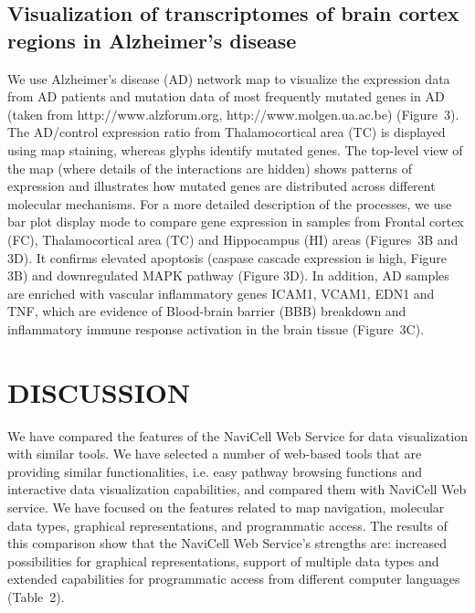 \documentclass[a4,center,fleqn]{NAR}
\begin{document}
\subsection{Visualization of transcriptomes of brain cortex regions in Alzheimer's disease}

We use Alzheimer's disease (AD) network map \cite{Mizuno2012} to visualize the
expression data from AD patients \cite{hokama2013altered} and mutation data of
most frequently mutated genes in AD (taken from http://www.alzforum.org,
http://www.molgen.ua.ac.be) (Figure~3). The AD/control expression ratio from
Thalamocortical area (TC) is displayed using map staining, whereas glyphs
identify mutated genes.  The top-level view of the map (where details of the
interactions are hidden) shows patterns of expression and illustrates how
mutated genes are distributed across different molecular mechanisms. For a more
detailed description of the processes, we use bar plot display mode to compare
gene expression in samples from Frontal cortex (FC), Thalamocortical area (TC)
and Hippocampus (HI) areas (Figures~3B and 3D). It confirms elevated apoptosis
(caspase cascade expression is high, Figure 3B) and downregulated MAPK pathway
(Figure 3D).  In addition, AD samples are enriched with vascular inflammatory
genes ICAM1, VCAM1, EDN1 and TNF, which are  evidence of Blood-brain barrier
(BBB) breakdown and inflammatory immune response activation in the brain tissue
(Figure~3C).

\section{DISCUSSION}

We have compared the features of the NaviCell Web Service for data
visualization with similar tools. We have selected a number of web-based tools
that are providing similar functionalities, i.e. easy pathway browsing
functions and interactive data visualization capabilities, and compared them
with NaviCell Web service. We have focused on the features related to map
navigation, molecular data types, graphical representations, and programmatic
access. The results of this comparison show that the NaviCell Web Service's
strengths are: increased possibilities for graphical representations, support
of multiple data types and extended capabilities for programmatic access from
different computer languages (Table~2).

\end{document}
